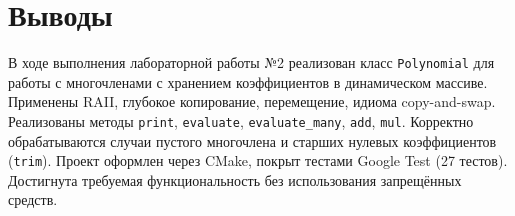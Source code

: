 \section{Выводы}

В ходе выполнения лабораторной работы №2 реализован класс \texttt{Polynomial} для работы с многочленами с хранением коэффициентов в динамическом массиве. Применены RAII, глубокое копирование, перемещение, идиома copy-and-swap. Реализованы методы \texttt{print}, \texttt{evaluate}, \texttt{evaluate\_many}, \texttt{add}, \texttt{mul}. Корректно обрабатываются случаи пустого многочлена и старших нулевых коэффициентов (\texttt{trim}). Проект оформлен через CMake, покрыт тестами Google Test (27 тестов). Достигнута требуемая функциональность без использования запрещённых средств.
